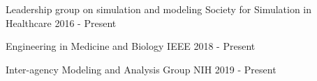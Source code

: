 
\begin{cventries}


  \cventry
    {Leadership group on simulation and modeling} %
    {Society for Simulation in Healthcare} %
    {} %
    {2016 - Present} %
    {
    }

      \cventry
    {Engineering in Medicine and Biology} %
    {IEEE} %
    {} %
    {2018 - Present} %
    {
    }

      \cventry
    {Inter-agency Modeling and Analysis Group } %
    {NIH } %
    {} %
    {2019 - Present} %
    {
    }

\end{cventries}
